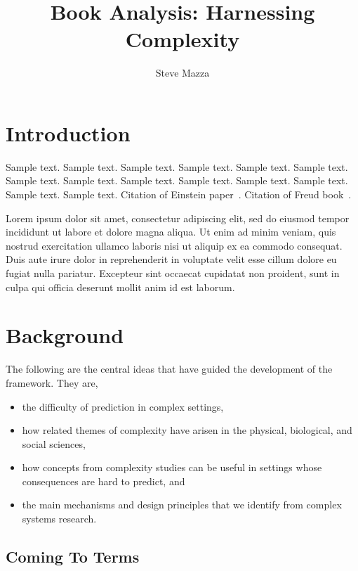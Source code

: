 \documentclass[jou,apacite]{apa6}
\title{Book Analysis: Harnessing Complexity}
\author{Steve Mazza}
\affiliation{Naval Postgraduate School}
\begin{document}
\maketitle    
                        
\section{Introduction}
Sample text. Sample text. Sample text. Sample text. Sample text. Sample text. 
Sample text. Sample text. Sample text. Sample text. Sample text. Sample text. 
Sample text. Sample text. Citation of Einstein paper~\cite{Axelrod}. Citation of Freud book~\cite{Axelrod}.

Lorem ipsum dolor sit amet, consectetur adipiscing elit, sed do eiusmod tempor incididunt ut labore et dolore magna aliqua. Ut enim ad minim veniam, quis nostrud exercitation ullamco laboris nisi ut aliquip ex ea commodo consequat. Duis aute irure dolor in reprehenderit in voluptate velit esse cillum dolore eu fugiat nulla pariatur. Excepteur sint occaecat cupidatat non proident, sunt in culpa qui officia deserunt mollit anim id est laborum.

\section{Background}

The following are the central ideas that have guided the development of the framework.  They are,
\begin{itemize}
  \item the difficulty of prediction in complex settings,
  \item how related themes of complexity have arisen in the physical, biological, and social sciences,
  \item how concepts from complexity studies can be useful in settings whose consequences are hard to predict, and
  \item the main mechanisms and design principles that we identify from complex systems research.
\end{itemize}

\subsection{Coming To Terms}
\end{document}
